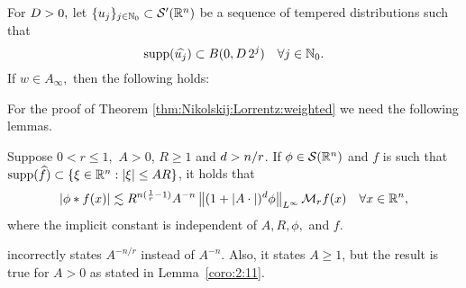 \begin{theorem}\label{thm:Nikolskij:Lorrentz:weighted} For $D> 0,$ let $\{u_j\}_{j \in \mathbb{N}_0} \subset \mathcal{S}'({{\mathbb R}^n})$ be a sequence of tempered distributions such that
\begin{equation*}
{\rm{supp}}(\widehat{u_j}) \subset B(0, D\, 2^j ) \quad \forall j \in \mathbb{N}_0.
\end{equation*}
If $w\in A_\infty,$ then the following holds:  
\end{theorem}
For the proof of Theorem \ref{thm:Nikolskij:Lorrentz:weighted} we need the following lemmas.

\begin{lemma}\label{coro:2:11}
Suppose $0 < r \leq 1,$  $A >0$, $R \geq 1$ and $d > n/r$. If $\phi \in {\mathcal{S}}({{\mathbb R}^n})$ and $f$ is such that  ${\rm{supp}}(\widehat{f}) \subset \{\xi\in{{\mathbb R}^n}:\left\vert \xi \right\vert\le AR\}$, it holds that
\begin{equation*}
|\phi * f(x)| \lesssim R^{n (\frac{1}{r}  -1)} A^{-n} \left\|(1 + |A \cdot|)^d \phi\right\|_{L^\infty}  \mathcal{M}_rf(x) \quad \forall x \in {{\mathbb R}^n},
\end{equation*}
where the implicit constant is independent of $A, R, \phi,$ and $f.$  
\end{lemma}
\begin{remark} \cite[Corollary 2.11]{MR837335} incorrectly states $A^{-n/r}$ instead of $ A^{-n}$. Also, it states $A \geq 1$, but the result is true for $A >0$ as stated in Lemma~\ref{coro:2:11}.
\end{remark}

